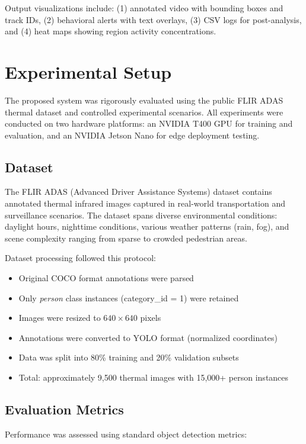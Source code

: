 \documentclass[conference]{IEEEtran}
\begin{document}
Output visualizations include: (1) annotated video with bounding boxes and track IDs, (2) behavioral alerts with text overlays, (3) CSV logs for post-analysis, and (4) heat maps showing region activity concentrations.

\section{Experimental Setup}

The proposed system was rigorously evaluated using the public FLIR ADAS thermal dataset and controlled experimental scenarios. All experiments were conducted on two hardware platforms: an NVIDIA T400 GPU for training and evaluation, and an NVIDIA Jetson Nano for edge deployment testing.

\subsection{Dataset}

The FLIR ADAS (Advanced Driver Assistance Systems) dataset contains annotated thermal infrared images captured in real-world transportation and surveillance scenarios. The dataset spans diverse environmental conditions: daylight hours, nighttime conditions, various weather patterns (rain, fog), and scene complexity ranging from sparse to crowded pedestrian areas.

Dataset processing followed this protocol:
\begin{itemize}
\item Original COCO format annotations were parsed
\item Only \textit{person} class instances (category\_id = 1) were retained
\item Images were resized to $640 \times 640$ pixels
\item Annotations were converted to YOLO format (normalized coordinates)
\item Data was split into 80\% training and 20\% validation subsets
\item Total: approximately 9,500 thermal images with 15,000+ person instances
\end{itemize}

\subsection{Evaluation Metrics}

Performance was assessed using standard object detection metrics:
\end{document}
